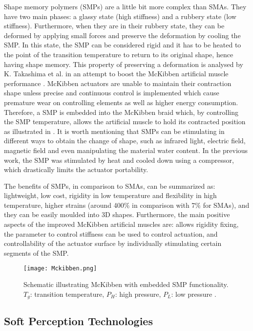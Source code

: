 Shape memory polymers (SMPs) are a little bit more complex than SMAs. They have two main phases: a glassy state (high stiffness) and a rubbery state (low stiffness). Furthermore, when they are in their rubbery state, they can be deformed by applying small forces and preserve the deformation by cooling the SMP. In this state, the SMP can be considered rigid and it has to be heated to the point of the transition temperature to return to its original shape, hence having shape memory. This property of preserving a deformation is analysed by K. Takashima et al. in an attempt to boost the McKibben artificial muscle performance \cite{Takashima2010}. McKibben actuators are unable to maintain their contraction shape unless precise and continuous control is implemented which cause premature wear on controlling elements as well as higher energy consumption. Therefore, a SMP is embedded into the McKibben braid which, by controlling the SMP temperature, allows the artificial muscle to hold its contracted position as illustrated in . It is worth mentioning that SMPs can be stimulating in different ways to obtain the change of shape, such as infrared light, electric field, magnetic field and even manipulating the material water content. In the previous work, the SMP was stimulated by heat and cooled down using a compressor, which drastically limits the actuator portability.

The benefits of SMPs, in comparison to SMAs, can be summarized as: lightweight, low cost, rigidity in low temperature and flexibility in high temperature, higher strains (around 400\% in comparison with 7\% for SMAs), and they can be easily moulded into 3D shapes. Furthermore, the main positive aspects of the improved McKibben artificial muscles are: allows rigidity fixing, the parameter to control stiffness can be used to control actuation, and controllability of the actuator surface by individually stimulating certain segments of the SMP.

\begin{figure}[hbtp!]
    \centering
    \texttt{[image: Mckibben.png]}
    \caption[Schematic illustrating McKibben with embedded SMP functionality. $T_g$: transition temperature, $P_H$: high pressure, $P_L$: low pressure.]{Schematic illustrating McKibben with embedded SMP functionality. $T_g$: transition temperature, $P_H$: high pressure, $P_L$: low pressure \cite{Takashima2010}. }
    \label{fig:mckibben}
\end{figure}

\subsection{Soft Perception Technologies}

